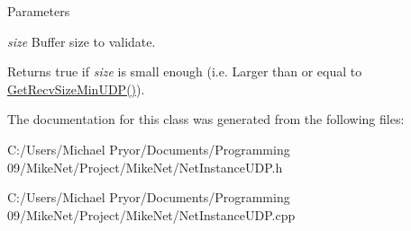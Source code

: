 \begin{DoxyParams}{Parameters}
\item[{\em size}]Buffer size to validate.\end{DoxyParams}
\begin{DoxyReturn}{Returns}
true if {\itshape size\/} is small enough (i.e. Larger than or equal to \hyperlink{class_net_instance_u_d_p_a66b09a826a620f60707158d5cb11febc}{GetRecvSizeMinUDP()}). 
\end{DoxyReturn}


The documentation for this class was generated from the following files:\begin{DoxyCompactItemize}
\item 
C:/Users/Michael Pryor/Documents/Programming 09/MikeNet/Project/MikeNet/NetInstanceUDP.h\item 
C:/Users/Michael Pryor/Documents/Programming 09/MikeNet/Project/MikeNet/NetInstanceUDP.cpp\end{DoxyCompactItemize}

